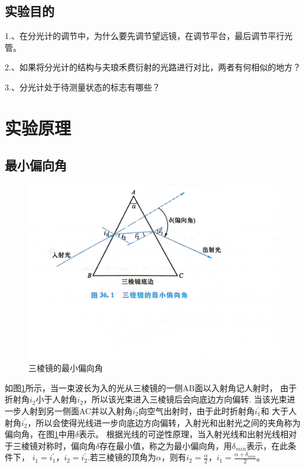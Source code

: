\documentclass{ctexart}
\begin{document}
  \subsection{实验目的}
  1.、在分光计的调节中，为什么要先调节望远镜，在调节平台，最后调节平行光管。

  2.、如果将分光计的结构与夫琅禾费衍射的光路进行对比，两者有何相似的地方？
  
  3.、分光计处于待测量状态的标志有哪些？

\section{实验原理}
  \subsection{最小偏向角}
  \begin{figure}[H]
    \centering
    \includegraphics[height=0.6\textwidth,width=1\textwidth]{zuixiaopianxiangjiao.jpg}
    \caption{三棱镜的最小偏向角}\label{zuixiaopianxiangjiao}
  \end{figure}
  如图\ref{zuixiaopianxiangjiao}所示，当一束波长为入的光从三棱镜的一侧AB面以入射角记人射时，
  由于折射角$i_{2}$小于人射角$i_{2}$，所以该光束进入三棱镜后会向底边方向偏转.
  当该光束进一步人射到另一侧面AC并以入射角${i}_{2}^{'}$向空气出射时，由于此时折射角${i}_{1}^{'}$和
  大于人射角$i_{2}^{'}$，所以会使得光线进一步向底边方向偏转，入射光和出射光之间的夹角称为偏向角，在图\ref{zuixiaopianxiangjiao}中用$\delta$表示。
  根据光线的可逆性原理，当入射光线和出射光线相对于三棱镜对称时，偏向角$\delta$存在最小值，称之为最小偏向角，用$\delta_{min}$表示，在此条件下，
  $i_{1}=i_{1}^{'}$，$i_{2}=i_{2}^{'}$.若三棱镜的顶角为$\alpha$，则有$i_{2}=\frac{\alpha}{2}$，$i_{1}=\frac{\alpha + \delta_{min}}{2}$。
  
\end{document}
